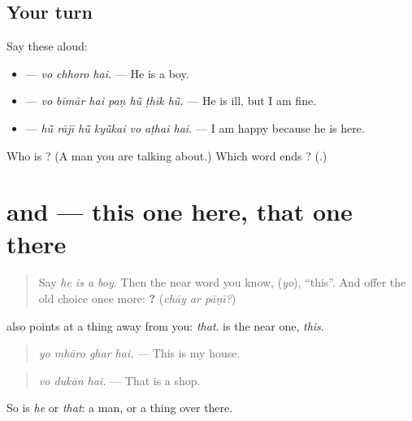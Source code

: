 \subsection*{Your turn}
Say these aloud:

\begin{itemize}
\raggedright
  \item \textbf{  } — \emph{vo chhoro hai.} — He is a boy.
  \item \textbf{      } — \emph{vo bīmār hai paṇ hū̃ ṭhīk hū̃.} — He is ill, but I am fine.
  \item \textbf{      } — \emph{hū̃ rājī hū̃ kyū̃kai vo aṭhai hai.} — I am happy because he is here.
\end{itemize}

\begin{tcolorbox}[breakable,colback=teal!4,colframe=teal!35!black,title={Before you move on}]
Who is \textbf{}? (A man you are talking about.) Which word ends \textbf{  }? (\textbf{}.)
\end{tcolorbox}
\section[\texorpdfstring{\mw{यो} · \mw{वो} (yo · vo)}{यो · वो (yo · vo)}]{ and  — this one here, that one there}

\label{lesson:MW-C152-yo-vo}



\begin{quote}
Say \emph{he is a boy}. Then the near word you know, \textbf{} (\emph{yo}), \textquotedblleft{}this\textquotedblright{}. And offer the old choice once more: \textbf{  ?} (\emph{chāy ar pāṇī?})
\end{quote}

\begin{grammarlens}[title={Grammar Lens: \mw{वो} points away}]
\textbf{} also points at a thing away from you: \emph{that}. \textbf{} is the near one, \emph{this}.

\begin{quote}
\textbf{   }
\end{quote}

\begin{quote}
\emph{yo mhāro ghar hai.} — This is my house.
\end{quote}

\begin{quote}
\textbf{  }
\end{quote}

\begin{quote}
\emph{vo dukān hai.} — That is a shop.
\end{quote}

So \textbf{} is \emph{he} or \emph{that}: a man, or a thing over there.
\end{grammarlens}

